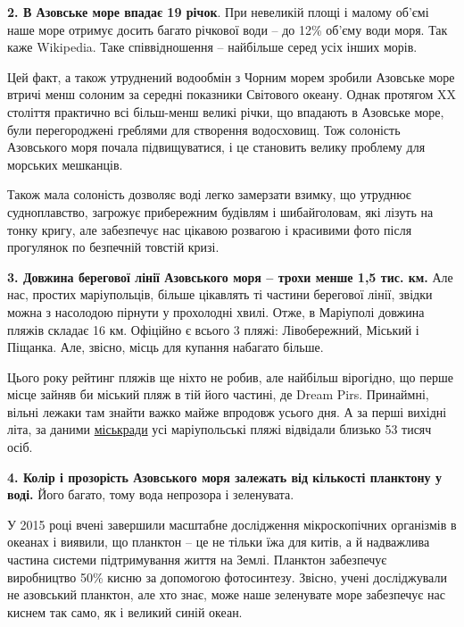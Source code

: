 \textbf{2. В Азовське море впадає 19 річок}. При невеликій площі і малому об'ємі наше
море отримує досить багато річкової води – до 12\% об'єму води моря. Так каже
Wikipedia. Таке співвідношення – найбільше серед усіх інших морів.

Цей факт, а також утруднений водообмін з Чорним морем зробили Азовське море
втричі менш солоним за середні показники Світового океану. Однак протягом XX
століття практично всі більш-менш великі річки, що впадають в Азовське море,
були перегороджені греблями для створення водосховищ. Тож солоність Азовського
моря почала підвищуватися, і це становить велику проблему для морських
мешканців.


Також мала солоність дозволяє воді легко замерзати взимку, що утруднює
судноплавство, загрожує прибережним будівлям і шибайголовам, які лізуть на
тонку кригу, але забезпечує нас цікавою розвагою і красивими фото після
прогулянок по безпечній товстій кризі.


\textbf{3. Довжина берегової лінії Азовського моря – трохи менше 1,5 тис. км.}
Але нас, простих маріупольців, більше цікавлять ті частини берегової лінії,
звідки можна з насолодою пірнути у прохолодні хвилі. Отже, в Маріуполі довжина
пляжів складає 16 км. Офіційно є всього 3 пляжі: Лівобережний, Міський і
Піщанка. Але, звісно, місць для купання набагато більше.

Цього року рейтинг пляжів ще ніхто не робив, але найбільш вірогідно, що перше
місце зайняв би міський пляж в тій його частині, де Dream Pirs. Принаймні,
вільні лежаки там знайти важко майже впродовж усього дня. А за перші вихідні
літа, за даними
\href{https://mariupolrada.gov.ua/ru/news/u-vihidni-mariupolski-pljazhi-vidvidalo-blizko-53-tisjach-cholovik}{міськради}
усі маріупольські пляжі відвідали близько 53 тисяч осіб.


\textbf{4. Колір і прозорість Азовського моря залежать від кількості планктону
у воді.} Його багато, тому вода непрозора і зеленувата.

У 2015 році вчені завершили масштабне дослідження мікроскопічних організмів в
океанах і виявили, що планктон – це не тільки їжа для китів, а й надважлива
частина системи підтримування життя на Землі. Планктон забезпечує виробництво
50\% кисню за допомогою фотосинтезу. Звісно, учені досліджували не азовський
планктон, але хто знає, може наше зеленувате море забезпечує нас киснем так
само, як і великий синій океан.


